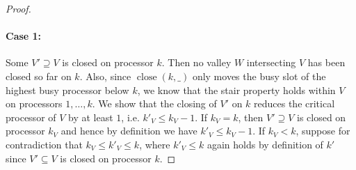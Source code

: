 \documentclass[a4paper]{article}
\DeclareMathOperator{\close}{close}
\begin{document}
\begin{proof}
  \paragraph{Case 1:}
      Some $V' \supseteq V$ is closed on processor $k$.
      Then no valley $W$ intersecting $V$ has been closed so far on $k$.
      Also, since $\close(k, \_)$ only moves the busy slot of the highest busy processor below $k$, we know that the stair property holds within $V$ on processors $1, \ldots, k$.
      We show that the closing of $V'$ on $k$ reduces the critical processor of $V$ by at least $1$, i.e. $k'_V \leq k_V - 1$.
      If $k_V = k$, then $V' \supseteq V$ is closed on processor $k_V$ and hence by definition we have $k'_V \leq k_V - 1$.
      If $k_V < k$, suppose for contradiction that $k_V \leq k'_V \leq k$, where $k'_V \leq k$ again holds by definition of $k'$ since $V' \subseteq V$ is closed on processor $k$.


\end{proof}
\end{document}
